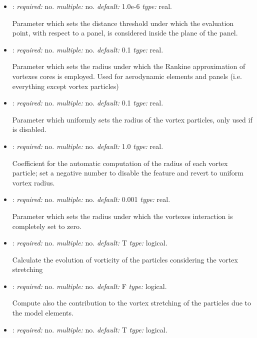 \begin{itemize}
\item {}: \textit{required:} no. \textit{multiple:} no. 
\textit{default:} 1.0e-6 \textit{type:} real.

Parameter which sets the distance threshold under which the evaluation point, 
with respect to a panel, is considered inside the plane of the panel.

\item {}: \textit{required:} no. \textit{multiple:} no. 
\textit{default:} 0.1 \textit{type:} real.

Parameter which sets the radius under which the Rankine approximation of 
vortexes cores is employed. Used for aerodynamic elements and panels 
(i.e. everything except vortex particles)

\item {}: \textit{required:} no. \textit{multiple:} no. 
\textit{default:} 0.1 \textit{type:} real.

Parameter which uniformly sets the radius of the vortex particles, only used if  is disabled.

\item {}: \textit{required:} no. \textit{multiple:} no. \textit{default:} 1.0 \textit{type:} real.

Coefficient for the automatic computation of the radius of each vortex particle; set a negative number to disable the feature and revert to uniform vortex radius. 

\item {}: \textit{required:} no. \textit{multiple:} no. 
\textit{default:} 0.001 \textit{type:} real. 

Parameter which sets the radius under which the vortexes interaction is completely set to zero.

\item {}: \textit{required:} no. \textit{multiple:} no. 
\textit{default:} T \textit{type:} logical.

Calculate the evolution of vorticity of the particles considering the 
vortex stretching

\item {}: \textit{required:} no. 
\textit{multiple:} no. \textit{default:} F \textit{type:} logical.

Compute also the contribution to the vortex stretching of the particles 
due to the model elements. 

\item {}: \textit{required:} no. \textit{multiple:} no. 
\textit{default:} T \textit{type:} logical.


\end{itemize}
